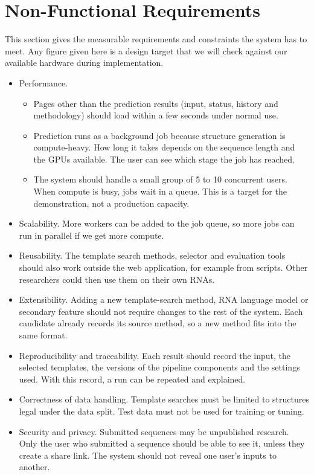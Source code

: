 \documentclass{FastFyp}
\begin{document}
\section{Non-Functional Requirements}
This section gives the measurable requirements and constraints the system has to meet. Any figure given here is a design target that we will check against our available hardware during implementation.
\begin{itemize}
\item Performance.
  \begin{itemize}
  \item Pages other than the prediction results (input, status, history and methodology) should load within a few seconds under normal use.
  \item Prediction runs as a background job because structure generation is compute-heavy. How long it takes depends on the sequence length and the GPUs available. The user can see which stage the job has reached.
  \item The system should handle a small group of 5 to 10 concurrent users. When compute is busy, jobs wait in a queue. This is a target for the demonstration, not a production capacity.
  \end{itemize}
\item Scalability. More workers can be added to the job queue, so more jobs can run in parallel if we get more compute.
\item Reusability. The template search methods, selector and evaluation tools should also work outside the web application, for example from scripts. Other researchers could then use them on their own RNAs.
\item Extensibility. Adding a new template-search method, RNA language model or secondary feature should not require changes to the rest of the system. Each candidate already records its source method, so a new method fits into the same format.
\item Reproducibility and traceability. Each result should record the input, the selected templates, the versions of the pipeline components and the settings used. With this record, a run can be repeated and explained.
\item Correctness of data handling. Template searches must be limited to structures legal under the data split. Test data must not be used for training or tuning.
\item Security and privacy. Submitted sequences may be unpublished research. Only the user who submitted a sequence should be able to see it, unless they create a share link. The system should not reveal one user's inputs to another.

\end{itemize}
\end{document}

